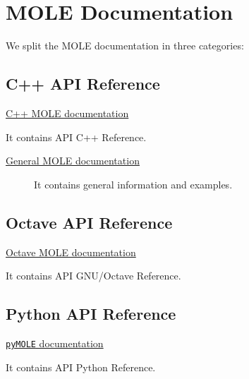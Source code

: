 \chapter{MOLE Documentation}

We split the MOLE documentation in three categories:

\section{C++ API Reference}

\href{https://carlosal1015.github.io/mole_examples/doxygen/cpp/html}{C++ MOLE documentation}

It contains API C++ Reference.

\begin{description}
	\item[\href{https://carlosal1015.github.io/mole_examples/html}{General MOLE documentation}]

	      It contains general information and examples.
\end{description}

\section{Octave API Reference}

\href{https://carlosal1015.github.io/mole_examples/doxygen/matlab}{Octave MOLE documentation}

It contains API GNU/Octave Reference.

\section{Python API Reference}

\href{https://pymole.readthedocs.io}{\texttt{pyMOLE} documentation}

It contains API Python Reference.


